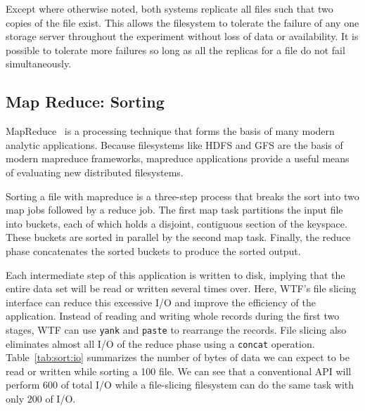 \documentclass[twocolumn,10pt,letterpaper]{article}
\newcommand{\code}[1]{\texttt{#1}}
\begin{document}
Except where otherwise noted, both systems replicate all files such that two
copies of the file exist.  This allows the filesystem to tolerate the failure of
any one storage server throughout the experiment without loss of data or
availability.  It is possible to tolerate more failures so long as all the
replicas for a file do not fail simultaneously.

\subsection{Map Reduce: Sorting}

MapReduce~\cite{mapreduce} is a processing technique that forms the basis of
many modern analytic applications.  Because filesystems like HDFS and GFS are
the basis of modern mapreduce frameworks, mapreduce applications provide a
useful means of evaluating new distributed filesystems.

Sorting a file with mapreduce is a three-step process that breaks the sort into
two map jobs followed by a reduce job.  The first map task partitions the input
file into buckets, each of which holds a disjoint, contiguous section of the
keyspace.  These buckets are sorted in parallel by the second map task.
Finally, the reduce phase concatenates the sorted buckets to produce the sorted
output.

Each intermediate step of this application is written to disk, implying that the
entire data set will be read or written several times over.  Here, WTF's file
slicing interface can reduce this excessive I/O and improve the efficiency of
the application.  Instead of reading and writing whole records during the first
two stages, WTF can use \code{yank} and \code{paste} to rearrange the records.
File slicing also eliminates almost all I/O of the reduce phase using a
\code{concat} operation.  Table~\ref{tab:sort:io} summarizes the number of bytes
of data we can expect to be read or written while sorting a
\unit{100}{\giga\byte} file.  We can see that a conventional API will perform
\unit{600}{\giga\byte} of total I/O while a file-slicing filesystem can do the
same task with only \unit{200}{\giga\byte} of I/O.
\end{document}
